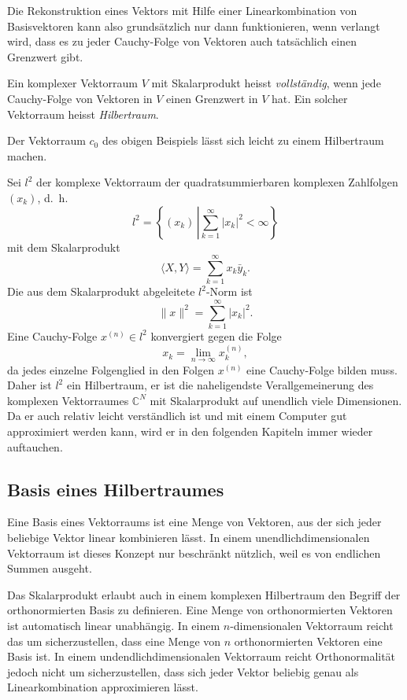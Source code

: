 Die Rekonstruktion eines Vektors mit Hilfe einer Linearkombination von
Basisvektoren kann also grundsätzlich nur dann funktionieren, wenn verlangt
wird, dass es zu jeder Cauchy-Folge von Vektoren auch tatsächlich einen
Grenzwert gibt.

\begin{definition}
Ein komplexer Vektorraum $V$ mit Skalarprodukt heisst {\em vollständig}, 
wenn jede Cauchy-Folge von Vektoren in $V$ einen Grenzwert in $V$ hat.
Ein solcher Vektorraum heisst {\em Hilbertraum}.
\end{definition}
%
%

Der Vektorraum $c_0$ des obigen Beispiels lässt sich leicht zu einem
Hilbertraum machen.

\begin{beispiel}
Sei $l^2$ der komplexe Vektorraum der quadratsummierbaren komplexen
Zahlfolgen $(x_k)$, d.~h.
%
\[
l^2 = \left\{ (x_k)\,\left| \sum_{k=1}^\infty |x_k|^2 < \infty \right.\right\}
\]
mit dem Skalarprodukt
\[
\langle X,Y\rangle = \sum_{k=1}^\infty x_k\bar{y}_k.
\]
Die aus dem Skalarprodukt abgeleitete $l^2$-Norm ist
\[
\|x\|^2 = \sum_{k=1}^\infty |x_k|^2.
\]
Eine Cauchy-Folge $x^{(n)}\in l^2$ konvergiert gegen die Folge
\[
x_k = \lim_{n\to\infty} x_k^{(n)},
\]
da jedes einzelne Folgenglied in den Folgen $x^{(n)}$ eine Cauchy-Folge
bilden muss.
Daher ist $l^2$ ein Hilbertraum, er ist die naheligendste Verallgemeinerung
des komplexen Vektorraumes $\mathbb{C}^N$ mit Skalarprodukt auf unendlich
viele Dimensionen.
Da er auch relativ leicht verständlich ist und mit einem Computer gut
approximiert werden kann, wird er in den folgenden Kapiteln immer wieder
auftauchen.
\end{beispiel}

\subsection{Basis eines Hilbertraumes
\label{subsection:hilbertraum-basis}}
Eine Basis eines Vektorraums ist eine Menge von Vektoren, aus der sich
jeder beliebige Vektor linear kombinieren lässt.
In einem unendlichdimensionalen Vektorraum ist dieses Konzept nur
beschränkt nützlich, weil es von endlichen Summen ausgeht.

Das Skalarprodukt erlaubt auch in einem komplexen Hilbertraum den Begriff
der orthonormierten Basis zu definieren.
Eine Menge von orthonormierten Vektoren ist automatisch linear unabhängig.
In einem $n$-dimensionalen Vektorraum reicht das um sicherzustellen,
dass eine Menge von $n$ orthonormierten Vektoren eine Basis ist.
In einem undendlichdimensionalen Vektorraum reicht Orthonormalität
jedoch nicht um sicherzustellen, dass sich jeder Vektor beliebig genau
als Linearkombination approximieren lässt.

